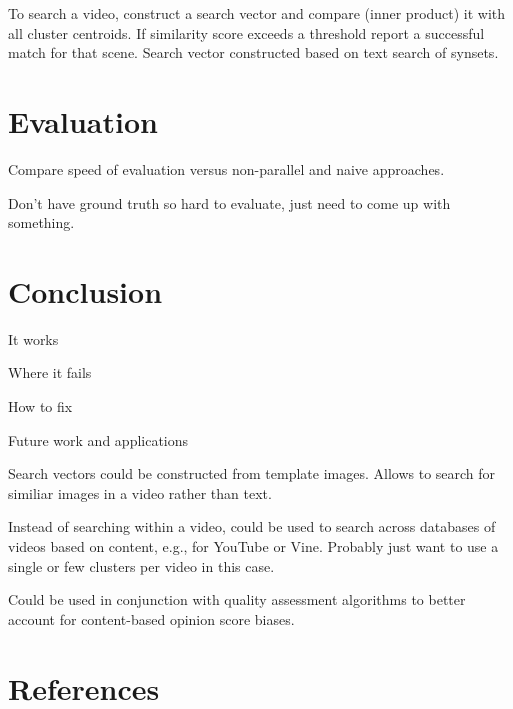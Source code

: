 \documentclass{article}
\begin{document}
To search a video, construct a search vector and compare (inner product)
it with all cluster centroids. If similarity score exceeds a threshold
report a successful match for that scene. Search vector constructed based
on text search of synsets.

\section{Evaluation}

Compare speed of evaluation versus non-parallel and naive approaches.

Don't have ground truth so hard to evaluate, just need to come up
with something.

\section{Conclusion}

It works

Where it fails

How to fix

Future work and applications

Search vectors could be constructed from template images. Allows to search
for similiar images in a video rather than text.

Instead of searching within a video, could be used to search across databases
of videos based on content, e.g., for YouTube or Vine. Probably just want to
use a single or few clusters per video in this case.

Could be used in conjunction with quality assessment algorithms to better
account for content-based opinion score biases.

\section{References}
\label{sec:ref}



\end{document}

